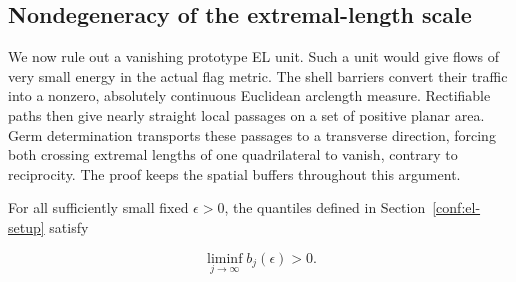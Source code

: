 \subsection{Nondegeneracy of the extremal-length scale}

We now rule out a vanishing prototype EL unit. Such a unit would give
flows of very small energy in the actual flag metric. The shell barriers
convert their traffic into a nonzero, absolutely continuous Euclidean
arclength measure. Rectifiable paths then give nearly straight local
passages on a set of positive planar area. Germ determination transports
these passages to a transverse direction, forcing both crossing
extremal lengths of one quadrilateral to vanish, contrary to reciprocity.
The proof keeps the spatial buffers throughout this argument.


\begin{proposition}\label{conf:el-nondegeneracy}
For all sufficiently small fixed \(\epsilon>0\), the quantiles defined in Section~\ref{conf:el-setup} satisfy

\begin{equation}\label{eq:original-16}
\liminf_{j\to\infty} b_j(\epsilon)>0.
\end{equation}
\end{proposition}
